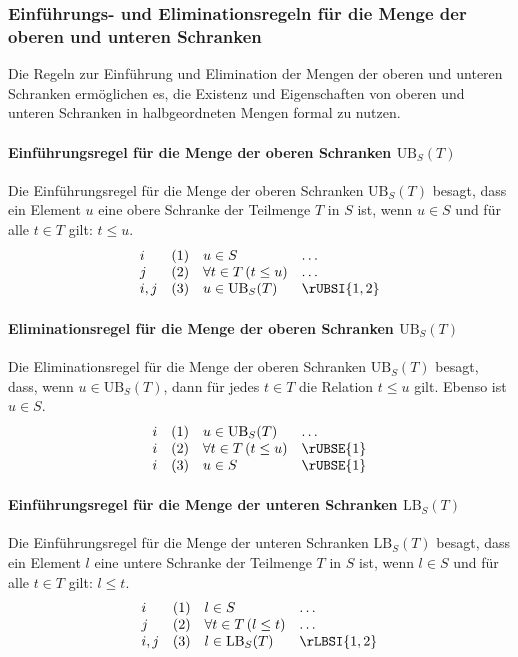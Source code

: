\documentclass{book}
\theoremstyle{plain}
\theoremstyle{remark}
\theoremstyle{definition}
\begin{document}
\subsubsection{Einführungs- und Eliminationsregeln für die Menge der oberen und unteren Schranken}
\label{rule:rUBSI} \label{rule:rUBSE} \label{rule:rLBSI} \label{rule:rLBSE}

Die Regeln zur Einführung und Elimination der Mengen der oberen und unteren Schranken ermöglichen es, die Existenz und Eigenschaften von oberen und unteren Schranken in halbgeordneten Mengen formal zu nutzen.

\paragraph{Einführungsregel für die Menge der oberen Schranken \(\text{UB}_S(T)\)}
Die Einführungsregel für die Menge der oberen Schranken \(\text{UB}_S(T)\) besagt, dass ein Element \(u\) eine obere Schranke der Teilmenge \(T\) in \( S \) ist, wenn \(u \in S\) und für alle \(t \in T\) gilt: \(t \leq u\).
\[
\begin{array}{llll}
    i   & (1) & u \in S & \dots \\
    j   & (2) & \forall t \in T \, (t \leq u) & \dots \\
    i,j & (3) & u \in \text{UB}_S(T) & \rUBSI{1,2}
\end{array}
\]

\paragraph{Eliminationsregel für die Menge der oberen Schranken \(\text{UB}_S(T)\)}
Die Eliminationsregel für die Menge der oberen Schranken \(\text{UB}_S(T)\) besagt, dass, wenn \(u \in \text{UB}_S(T)\), dann für jedes \(t \in T\) die Relation \(t \leq u\) gilt. Ebenso ist \(u \in S\).
\[
\begin{array}{llll}
    i & (1) & u \in \text{UB}_S(T) & \dots \\
    i & (2) & \forall t \in T \, (t \leq u) & \rUBSE{1} \\
    i & (3) & u \in S & \rUBSE{1}
\end{array}
\]

\paragraph{Einführungsregel für die Menge der unteren Schranken \(\text{LB}_S(T)\)}
Die Einführungsregel für die Menge der unteren Schranken \(\text{LB}_S(T)\) besagt, dass ein Element \(l\) eine untere Schranke der Teilmenge \(T\) in \( S \) ist, wenn \(l \in S\) und für alle \(t \in T\) gilt: \(l \leq t\).
\[
\begin{array}{llll}
    i   & (1) & l \in S & \dots \\
    j   & (2) & \forall t \in T \, (l \leq t) & \dots \\
    i,j & (3) & l \in \text{LB}_S(T) & \rLBSI{1,2}
\end{array}
\]
\end{document}
